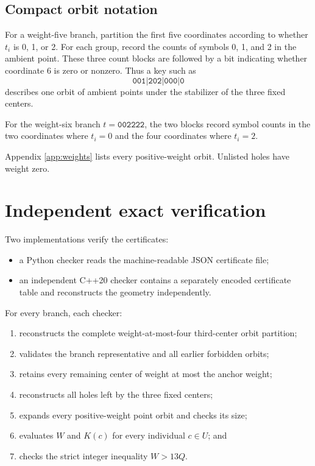 \documentclass[11pt]{article}
\newcommand{\codeword}[1]{\texttt{#1}}
\begin{document}
\subsection{Compact orbit notation}

For a weight-five branch, partition the first five coordinates according to
whether \(t_i\) is 0, 1, or 2.  For each group, record the counts of symbols
0, 1, and 2 in the ambient point.  These three count blocks are followed by
a bit indicating whether coordinate 6 is zero or nonzero.  Thus a key such
as
\[
  \codeword{001|202|000|0}
\]
describes one orbit of ambient points under the stabilizer of the three
fixed centers.

For the weight-six branch \(t=\codeword{002222}\), the two blocks record
symbol counts in the two coordinates where \(t_i=0\) and the four
coordinates where \(t_i=2\).

Appendix \ref{app:weights} lists every positive-weight orbit.  Unlisted holes
have weight zero.

\section{Independent exact verification}

Two implementations verify the certificates:

\begin{itemize}[leftmargin=2em]
  \item a Python checker reads the machine-readable JSON certificate file;
  \item an independent C++20 checker contains a separately encoded
        certificate table and reconstructs the geometry independently.
\end{itemize}

For every branch, each checker:

\begin{enumerate}[leftmargin=2em]
  \item reconstructs the complete weight-at-most-four third-center orbit
        partition;
  \item validates the branch representative and all earlier forbidden
        orbits;
  \item retains every remaining center of weight at most the anchor weight;
  \item reconstructs all holes left by the three fixed centers;
  \item expands every positive-weight point orbit and checks its size;
  \item evaluates \(W\) and \(K(c)\) for every individual \(c\in U\); and
  \item checks the strict integer inequality \(W>13Q\).
\end{enumerate}
\end{document}
